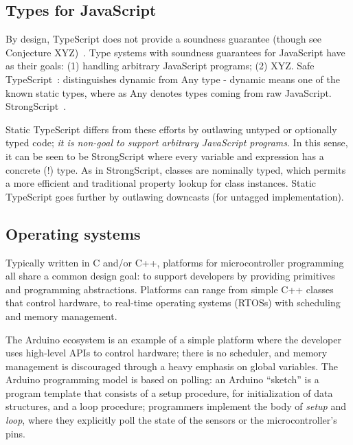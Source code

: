 



\subsection{Types for JavaScript}

By design, TypeScript does not provide a soundness guarantee (though see Conjecture XYZ)~\cite{BiermanAT14}.
Type systems with soundness guarantees for JavaScript have as their
goals: (1) handling arbitrary JavaScript programs; (2) XYZ.
Safe TypeScript~\cite{SafeTypeScript15}: distinguishes dynamic from Any type - dynamic means
one of the known static types, where as Any denotes types coming
from raw JavaScript.
StrongScript~\cite{StrongScriptECOOP15}.

Static TypeScript differs from these efforts by outlawing untyped or optionally typed
code; \emph{it is non-goal to support arbitrary JavaScript programs}.
In this sense, it can be seen to be StrongScript where every variable and 
expression has a concrete (!) type.   As in StrongScript, classes are nominally typed,
which permits a more efficient and traditional property lookup for class instances. 
Static TypeScript goes further by outlawing downcasts (for untagged implementation).

\subsection{Operating systems}

Typically written in C and/or C++, platforms for microcontroller programming all share 
a common design goal: to support developers by providing primitives and programming 
abstractions. Platforms can range from simple C++ classes that control hardware, 
to real-time operating systems (RTOSs) with scheduling and memory management.

The Arduino ecosystem is an example of a simple platform where the developer uses 
high-level APIs to control hardware; there is no scheduler, and memory management 
is discouraged through a heavy emphasis on global variables.  The Arduino programming 
model is based on polling: an Arduino ``sketch'' is a program template that consists 
of a setup procedure, for initialization of data structures, and a loop procedure; 
programmers implement the body of \textit{setup} and \textit{loop}, where they explicitly 
poll the state of the sensors or the microcontroller's pins.

